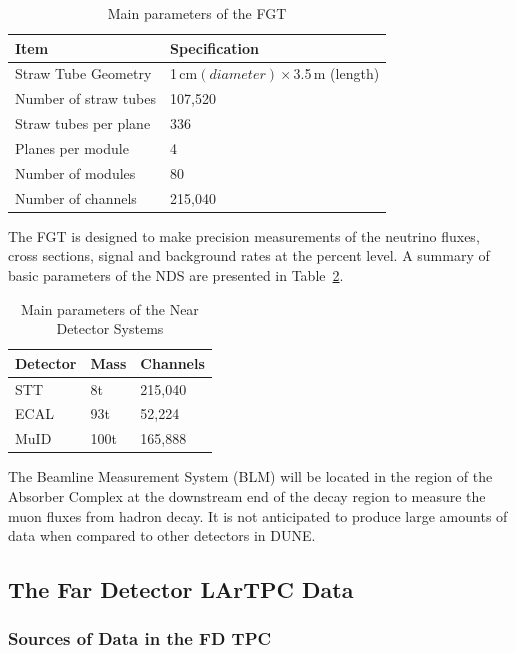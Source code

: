 \begin{table}[ht!]
\centering
\begin{tabular}{| p{2in} | p{1.5in} |}		\hline		
\textbf{Item} & \textbf{Specification} \\ \hline
Straw Tube Geometry & 1\,cm$ (diameter)\times$3.5\,m (length) \\ \hline
Number of straw tubes & 107,520\\ \hline
Straw tubes per plane & 336 \\ \hline
Planes per module & 4 \\ \hline
Number of modules & 80 \\ \hline
Number of channels & 215,040 \\ \hline
\end{tabular}
\caption{Main parameters of the FGT}
\label{tab:fgt-params}
\end{table}

The FGT is designed to make precision measurements of the neutrino
fluxes, cross sections, signal and background rates at the percent level. A summary of basic parameters of the
NDS are presented in Table~\ref{tab:nds-params}.
\begin{table}[ht!]
\centering
\begin{tabular}{| p{1in} | p{1in} | p{1in} |}		\hline		
\textbf{Detector} & \textbf{Mass} & \textbf{Channels} \\ \hline
STT & 8t & 215,040 \\ \hline
ECAL & 93t & 52,224 \\ \hline
MuID & 100t & 165,888 \\ \hline
\end{tabular}
\caption{Main parameters of the Near Detector Systems}
\label{tab:nds-params}
\end{table}

The Beamline Measurement System (BLM) will be located in the region of the Absorber Complex
at the downstream end of the decay region to measure the muon fluxes from hadron decay.
It is not anticipated to produce large amounts of data when compared to other detectors in DUNE.

\subsection{The Far Detector LArTPC Data}
\label{sec:fd-data-overview}
\subsubsection{Sources of Data in the FD TPC}

